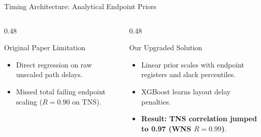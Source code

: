 \documentclass[aspectratio=169,10pt]{beamer}
\begin{document}
\begin{frame}{Timing Architecture: Analytical Endpoint Priors}
    \centering

    \vspace{0.35cm}
    \begin{columns}[T]
        \begin{column}{0.48\textwidth}
            \begin{block}{\centering Original Paper Limitation}
                \footnotesize
                \begin{itemize}
                    \item Direct regression on raw unscaled path delays.
                    \item Missed total failing endpoint scaling ($R = 0.90$ on TNS).
                \end{itemize}
            \end{block}
        \end{column}
        \begin{column}{0.48\textwidth}
            \begin{block}{\centering Our Upgraded Solution}
                \footnotesize
                \begin{itemize}
                    \item Linear prior scales with endpoint registers and slack percentiles.
                    \item XGBoost learns layout delay penalties.
                    \item \textbf{Result: TNS correlation jumped to 0.97 (WNS $R=0.99$)}.
                \end{itemize}
            \end{block}
        \end{column}
    \end{columns}
\end{frame}
\end{document}
